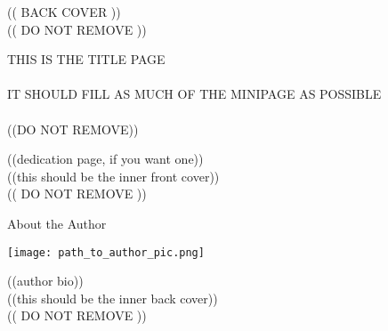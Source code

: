 \documentclass[a4paper,landscape]{article}
\begin{document}
\selectfont


\begin{minipage}[t]{0.45\linewidth}
    \begin{center}
        (( BACK COVER ))\\
        (( DO NOT REMOVE ))
    \end{center}
\end{minipage}
\hspace{0.65in}%
\begin{minipage}[t]{0.467\linewidth}
    \vspace*{0.2\textheight}
    \begin{center}
        \huge THIS IS THE TITLE PAGE \\ \\
        \vspace*{0.05\textheight}
        IT SHOULD FILL AS MUCH OF THE MINIPAGE AS POSSIBLE\\ \\
        \vspace*{0.05\textheight}
        ((DO NOT REMOVE))
    \end{center}
    
\end{minipage}
\newpage

\newpage


\begin{minipage}[t]{0.45\linewidth}
\begin{center}
\vspace*{0.3\textheight}
((dedication page, if you want one))\\
((this should be the inner front cover))\\
(( DO NOT REMOVE ))
\end{center}
\end{minipage}%
\hspace{0.75in}%
\begin{minipage}[t]{0.4\linewidth}
\vspace*{0.2\textheight}
\begin{center}
\Large{About the Author}
\end{center}
\begin{center}
\texttt{[image: path\_to\_author\_pic.png]}
\end{center}
\begin{center}
((author bio))\\
((this should be the inner back cover)) \\
(( DO NOT REMOVE ))
\end{center}%
\end{minipage}%
\end{document}
